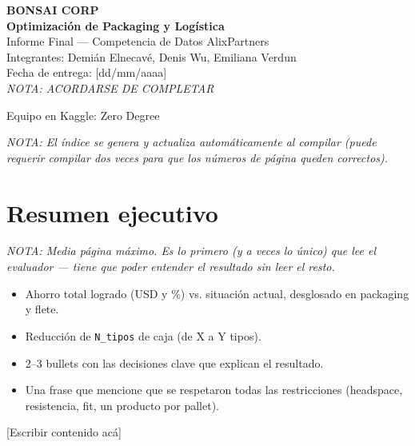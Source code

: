 \documentclass[11pt]{article}
\newcommand{\nota}[1]{{\itshape\color{notegray}\small NOTA: #1}\par\vspace{2pt}}
\newenvironment{notalist}{\begin{itemize}[itemsep=1pt,topsep=2pt,leftmargin=1.4em]\itshape\color{notegray}\small}{\end{itemize}\vspace{2pt}}
\newcommand{\placeholder}{\color{placeholdergray}[Escribir contenido acá]\color{black}\par\vspace{6pt}}
\begin{document}
\begin{titlepage}
\centering
\vspace*{4cm}
{\color{bonsaigreen}\bfseries\large BONSAI CORP}\\[0.6cm]
{\bfseries\Huge Optimización de Packaging y Logística}\\[0.4cm]
{\color{notegray}\Large Informe Final --- Competencia de Datos AlixPartners}\\[2cm]

\large
Integrantes: Demián Elnecavé, Denis Wu, Emiliana Verdun\\[0.3cm]
Fecha de entrega: [dd/mm/aaaa]\\[0.3cm]
\nota{\color{red}ACORDARSE DE COMPLETAR}
Equipo en Kaggle: Zero Degree\\[0.3cm]

\end{titlepage}

\tableofcontents
\nota{El índice se genera y actualiza automáticamente al compilar (puede requerir compilar dos veces para que los números de página queden correctos).}
\newpage

\section{Resumen ejecutivo}

\nota{Media página máximo. Es lo primero (y a veces lo único) que lee el evaluador --- tiene que poder entender el resultado sin leer el resto.}
\begin{notalist}
\item Ahorro total logrado (USD y \%) vs. situación actual, desglosado en packaging y flete.
\item Reducción de \texttt{N\_tipos} de caja (de X a Y tipos).
\item 2--3 bullets con las decisiones clave que explican el resultado.
\item Una frase que mencione que se respetaron todas las restricciones (headspace, resistencia, fit, un producto por pallet).
\end{notalist}
\placeholder
\end{document}
